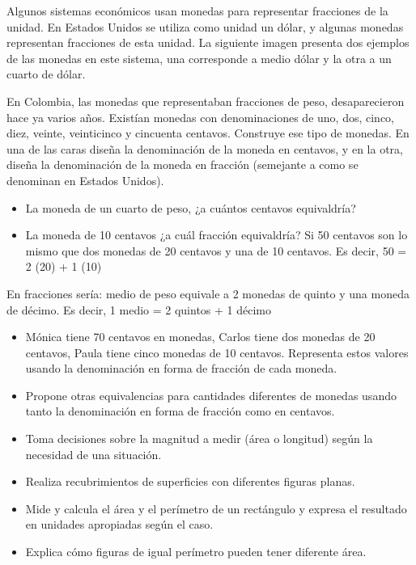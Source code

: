 \ejemplo

Algunos sistemas económicos usan monedas para representar fracciones de la unidad. En Estados Unidos se utiliza como unidad un dólar, y algunas monedas representan fracciones de esta unidad. La siguiente imagen presenta dos ejemplos de las monedas en este sistema, una corresponde a medio dólar y la otra a un cuarto de dólar.


En Colombia, las monedas que representaban fracciones de peso, desaparecieron hace ya varios años. Existían monedas con denominaciones de uno, dos, cinco, diez, veinte, veinticinco y cincuenta centavos. Construye ese tipo de monedas. En una de las caras diseña la denominación de la moneda en centavos, y en la otra, diseña la denominación de la moneda en fracción (semejante a como se denominan en Estados Unidos).

\begin{itemize}
  \item La moneda de un cuarto de peso, ¿a cuántos centavos equivaldría?
  \item La moneda de 10 centavos ¿a cuál fracción equivaldría? Si 50 centavos son lo mismo que dos monedas de 20 centavos y una de 10 centavos. Es decir, 50 = 2 (20) + 1 (10)
\end{itemize}
En fracciones sería: medio de peso equivale a 2 monedas de quinto y una moneda de décimo. Es decir, 1 medio = 2 quintos + 1 décimo

\begin{itemize}
  \item Mónica tiene 70 centavos en monedas, Carlos tiene dos monedas de 20 centavos, Paula tiene cinco monedas de 10 centavos. Representa estos valores usando la denominación en forma de fracción de cada moneda.
  \item Propone otras equivalencias para cantidades diferentes de monedas usando tanto la denominación en forma de fracción como en centavos.
\end{itemize}


\evidencias

\begin{itemize}
  \item Toma decisiones sobre la magnitud a medir (área o longitud) según la necesidad de una situación.
  \item Realiza recubrimientos de superficies con diferentes figuras planas.
  \item Mide y calcula el área y el perímetro de un rectángulo y expresa el resultado en unidades apropiadas según el caso.
  \item Explica cómo figuras de igual perímetro pueden tener diferente área.
\end{itemize}

